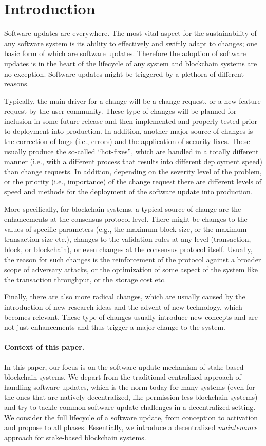 \section{Introduction}
Software updates are everywhere. The most vital aspect for the sustainability of any software system is its ability to effectively and swiftly adapt to changes; one basic form of which are software updates. Therefore the adoption of software updates is in the heart of the lifecycle of any system and blockchain systems are no exception. Software updates might be triggered by a plethora of different reasons. 

Typically, the main driver for a change will be a change request, or a new feature request by the user community. These type of changes will be planned for inclusion in some future release and then implemented and properly tested prior to deployment into production. In addition, another major source of changes is the correction of bugs (i.e., errors) and the application of security fixes. These usually produce the so-called \enquote{hot-fixes}, which are handled in a totally different manner (i.e., with a different process that results into different deployment speed) than change requests. In addition, depending on the severity level of the problem, or the priority (i.e., importance) of the change request there are different levels of speed and methods for the deployment of the software update into production. 

More specifically, for blockchain systems, a typical source of change are the enhancements at the consensus protocol level. There might be changes to the values of specific parameters (e.g., the maximum block size, or the maximum transaction size etc.), changes to the validation rules at any level (transaction, block, or blockchain), or even changes at the consensus protocol itself. Usually, the reason for such changes is the reinforcement of the protocol against a broader scope of adversary attacks, or the optimization of some aspect of the system like the transaction throughput, or the storage cost etc.

Finally, there are also more radical changes, which are usually caused by the introduction of new research ideas  and the advent of new technology, which becomes relevant. These type of changes usually introduce new concepts and are not just enhancements and thus trigger a major change to the system.

\paragraph{Context of this paper.} 
In this paper, our focus is on the software update mechanism of stake-based blockchain systems. We depart from the traditional centralized approach of handling software updates, which is the norm today for many systems (even for the ones that are natively decentralized, like permission-less blockchain systems) and try to tackle common software update challenges in a decentralized setting. We consider the full lifecycle of a software update, from conception to activation and propose  to all phases. Essentially, we introduce a decentralized \emph{maintenance} approach for stake-based blockchain systems.

